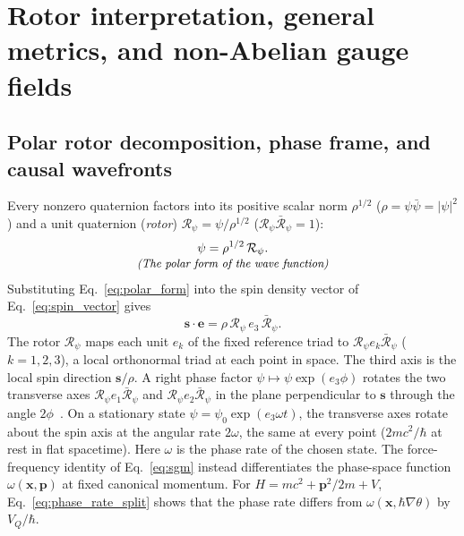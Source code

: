 \documentclass[aps,prd,onecolumn,tightenlines,nofootinbib,notitlepage,11pt,floatfix]{revtex4-2}
\theoremstyle{indentedtheorem}
\begin{document}
\section{Rotor interpretation, general metrics, and non-Abelian gauge fields}
\label{sec:geometry_extensions}

\subsection{Polar rotor decomposition, phase frame, and causal wavefronts}
\label{sec:wavefunction}

Every nonzero quaternion factors into its positive scalar norm $\rho^{1/2}$ ($\rho = \psi\bar{\psi} = |\psi|^2$) and a unit quaternion (\emph{rotor}) $\mathcal{R}_\psi = \psi/\rho^{1/2}$ ($\mathcal{R}_\psi\bar{\mathcal{R}}_\psi = 1$):
\begin{equation}
    \begin{gathered}
    \psi = \rho^{1/2}\,\mathcal{R}_\psi . \\[-3pt]
    \text{\small\itshape (The polar form of the wave function)}
    \end{gathered}
    \label{eq:polar_form}
\end{equation}
Substituting Eq.~\eqref{eq:polar_form} into the spin density vector of Eq.~\eqref{eq:spin_vector} gives
\begin{equation}
    \mathbf{s}\cdot\mathbf{e} = \rho\,\mathcal{R}_\psi\,e_3\,\bar{\mathcal{R}}_\psi .
    \label{eq:spin_rotor}
\end{equation}
The rotor $\mathcal{R}_\psi$ maps each unit $e_k$ of the fixed reference triad to $\mathcal{R}_\psi e_k\bar{\mathcal{R}}_\psi$ ($k=1,2,3$), a local orthonormal triad at each point in space. The third axis is the local spin direction $\mathbf{s}/\rho$. A right phase factor $\psi\mapsto\psi\exp(e_3\phi)$ rotates the two transverse axes $\mathcal{R}_\psi e_1\bar{\mathcal{R}}_\psi$ and $\mathcal{R}_\psi e_2\bar{\mathcal{R}}_\psi$ in the plane perpendicular to $\mathbf{s}$ through the angle $2\phi$~\citep{Hestenes1967Real,Hestenes1990Zitterbewegung}. On a stationary state $\psi = \psi_0\exp(e_3\omega t)$, the transverse axes rotate about the spin axis at the angular rate $2\omega$, the same at every point ($2mc^2/\hbar$ at rest in flat spacetime). Here $\omega$ is the phase rate of the chosen state. The force-frequency identity of Eq.~\eqref{eq:sgm} instead differentiates the phase-space function $\omega(\mathbf{x},\mathbf{p})$ at fixed canonical momentum. For $H = mc^2 + \mathbf{p}^2/2m + V$, Eq.~\eqref{eq:phase_rate_split} shows that the phase rate differs from $\omega(\mathbf{x},\hbar\nabla\theta)$ by $V_Q/\hbar$.
\end{document}
